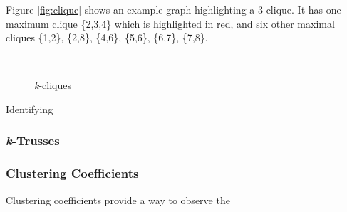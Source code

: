 Figure \ref{fig:clique} shows an example graph highlighting a 3-clique. It has one maximum clique \{2,3,4\} which is highlighted in red, and six other maximal cliques \{1,2\}, \{2,8\}, \{4,6\}, \{5,6\}, \{6,7\}, \{7,8\}.

\begin{figure}
  \centering
   ~  ~ 
  \caption{\emph{k}-cliques}
  \label{fig:cliques}
\end{figure}

Identifying \cite{bomze99}

\subsubsection{\emph{k}-Trusses}

\subsubsection{Clustering Coefficients}
Clustering coefficients provide a way to observe the 
